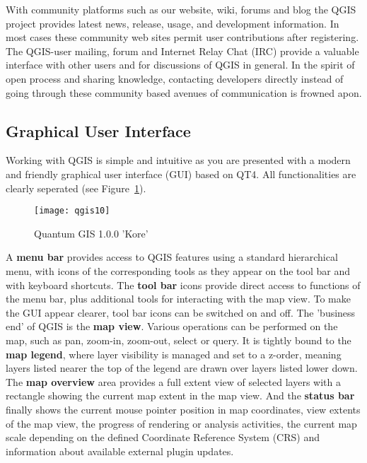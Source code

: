 With community platforms such as our website, wiki, forums and blog the QGIS project
provides latest news, release, usage, and development information. In most cases 
these community web sites permit user contributions after registering. 
The QGIS-user mailing, forum and Internet Relay Chat (IRC) provide a valuable interface 
with other users and for discussions of QGIS in general. In the spirit of open 
process and sharing knowledge, contacting developers directly instead of going through 
these community based avenues of communication is frowned apon.

\subsection{Graphical User Interface}

Working with QGIS is simple and intuitive as you are presented with a
modern and friendly graphical user interface (GUI) based on QT4. All
functionalities are clearly seperated (see Figure~\ref{fig:qgis10}).

\begin{figure}[h]
   \begin{center}
   \caption{Quantum GIS 1.0.0 'Kore'}\label{fig:qgis10}\smallskip
   \texttt{[image: qgis10]}
\end{center}
\end{figure}

A \textbf{menu bar} provides access to QGIS features using a standard
hierarchical menu, with icons of the corresponding tools as they appear on
the tool bar and with keyboard shortcuts. The \textbf{tool bar} icons provide
direct access to functions of the menu bar, plus additional tools for
interacting with the map view. To make the GUI appear clearer, tool bar icons
can be switched on and off. The 'business end' of QGIS is the \textbf{map
view}. Various operations can be performed on the map, such as pan, zoom-in,
zoom-out, select or query. It is tightly bound to the \textbf{map legend},
where layer visibility is managed and set to a z-order, meaning layers
listed nearer the top of the legend are drawn over layers listed lower down.
The \textbf{map overview} area provides a full extent view of selected layers
with a rectangle showing the current map extent in the map view. And the
\textbf{status bar} finally shows the current mouse pointer position in map
coordinates, view extents of the map view, the progress of rendering or
analysis activities, the current map scale depending on the defined
Coordinate Reference System (CRS) and information about available external
plugin updates.

